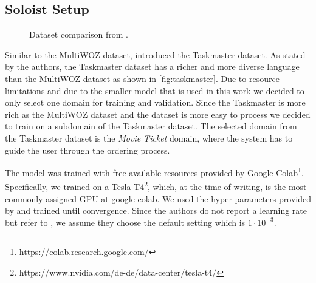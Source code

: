 \documentclass[twocolumn]{tum-article}
\begin{document}
\subsection{Soloist Setup}\label{sec:soloist_setup}
\begin{figure}[!h]
\centering
{}
\caption{Dataset comparison from \cite{byrne2019taskmaster}.}
\label{fig:taskmaster}
\end{figure}
Similar to the MultiWOZ dataset, \cite{byrne2019taskmaster} introduced the Taskmaster dataset. As stated by the authors, the Taskmaster dataset has a richer and more diverse language than the MultiWOZ dataset as shown in \autoref{fig:taskmaster}. Due to resource limitations and due to the smaller model that is used in this work we decided to only select one domain for training and validation. Since the Taskmaster is more rich as the MultiWOZ dataset and the dataset is more easy to process we decided to train on a subdomain of the Taskmaster dataset. The selected domain from the Taskmaster dataset is the \textit{Movie Ticket} domain, where the system has to guide the user through the ordering process. 

The model was trained with free available resources provided by Google Colab\footnote{\url{https://colab.research.google.com/}}. Specifically, we trained on a Tesla T4\footnote{https://www.nvidia.com/de-de/data-center/tesla-t4/}, which, at the time of writing, is the most commonly assigned GPU at google colab. We used the hyper parameters provided by \cite{peng2020soloist} and trained until convergence. Since the authors do not report a learning rate but refer to \cite{kingma2014adam}, we assume they choose the default setting which is $1\cdot 10^{-3}$. 
\end{document}
